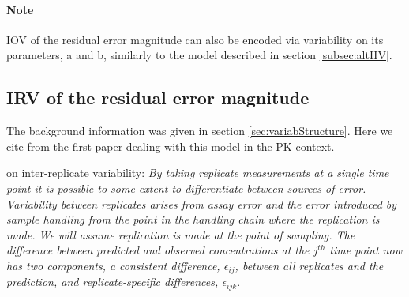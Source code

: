  
\paragraph{Note} IOV of the residual error magnitude can also be encoded via variability 
on its parameters, a and b, similarly to the model described in section \ref{subsec:altIIV}.

\subsection{IRV  of the residual error magnitude}
The background information was given in section \ref{sec:variabStructure}. 
Here we cite from the first paper dealing with this model in the PK context.

\cite{Karlsson:1995rm} on inter-replicate variability: \emph{By taking
replicate measurements at a single time point it is possible to some extent
to differentiate between sources of error. Variability between replicates arises
from assay error and the error introduced by sample handling from the
point in the handling chain where the replication is made. We will assume
replication is made at the point of sampling. The difference between predicted 
and observed concentrations at the $j^{th}$ time point now has two components, 
a consistent difference, $\epsilon_{ij}$, between all replicates
and the prediction, and replicate-specific differences, $\epsilon_{ijk}$}.

%
%


